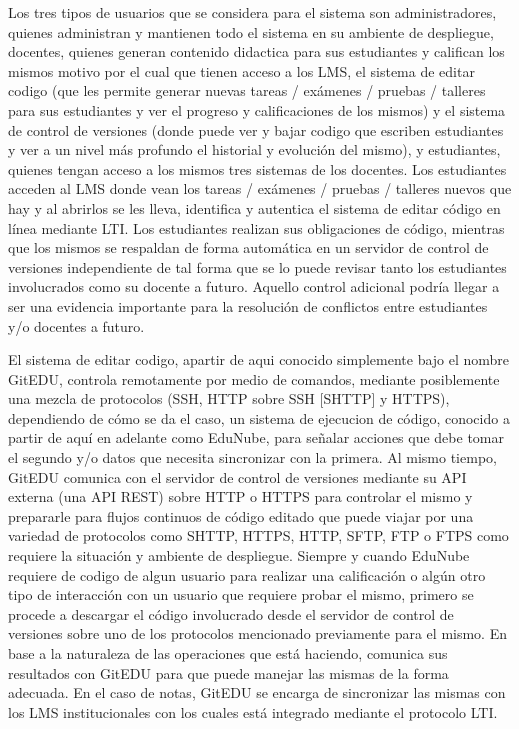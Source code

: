 Los tres tipos de usuarios que se considera para el sistema son administradores, quienes administran y mantienen todo el sistema en su ambiente de despliegue, docentes, quienes generan contenido didactica para sus estudiantes y califican los mismos motivo por el cual que tienen acceso a los LMS, el sistema de editar codigo (que les permite generar nuevas tareas / exámenes / pruebas / talleres para sus estudiantes y ver el progreso y calificaciones de los mismos) y el sistema de control de versiones (donde puede ver y bajar codigo que escriben estudiantes y ver a un nivel más profundo el historial y evolución del mismo), y estudiantes, quienes tengan acceso a los mismos tres sistemas de los docentes. Los estudiantes acceden al LMS donde vean los tareas / exámenes / pruebas / talleres nuevos que hay y al abrirlos se les lleva, identifica y autentica el sistema de editar código en línea mediante LTI. Los estudiantes realizan sus obligaciones de código, mientras que los mismos se respaldan de forma automática en un servidor de control de versiones independiente de tal forma que se lo puede revisar tanto los estudiantes involucrados como su docente a futuro. Aquello control adicional podría llegar a ser una evidencia importante para la resolución de conflictos entre estudiantes y/o docentes a futuro.

El sistema de editar codigo, apartir de aqui conocido simplemente bajo el nombre GitEDU, controla remotamente por medio de comandos, mediante posiblemente una mezcla de protocolos (SSH, HTTP sobre SSH [SHTTP] y HTTPS), dependiendo de cómo se da el caso, un sistema de ejecucion de código, conocido a partir de aquí en adelante como EduNube, para señalar acciones que debe tomar el segundo y/o datos que necesita sincronizar con la primera. Al mismo tiempo, GitEDU comunica con el servidor de control de versiones mediante su API externa (una API REST) sobre HTTP o HTTPS para controlar el mismo y prepararle para flujos continuos de código editado que puede viajar por una variedad de protocolos como SHTTP, HTTPS, HTTP, SFTP, FTP o FTPS como requiere la situación y ambiente de despliegue. Siempre y cuando EduNube requiere de codigo de algun usuario para realizar una calificación o algún otro tipo de interacción con un usuario que requiere probar el mismo, primero se procede a descargar el código involucrado desde el servidor de control de versiones sobre uno de los protocolos mencionado previamente para el mismo. En base a la naturaleza de las operaciones que está haciendo, comunica sus resultados con GitEDU para que puede manejar las mismas de la forma adecuada. En el caso de notas, GitEDU se encarga de sincronizar las mismas con los LMS institucionales con los cuales está integrado mediante el protocolo LTI.

